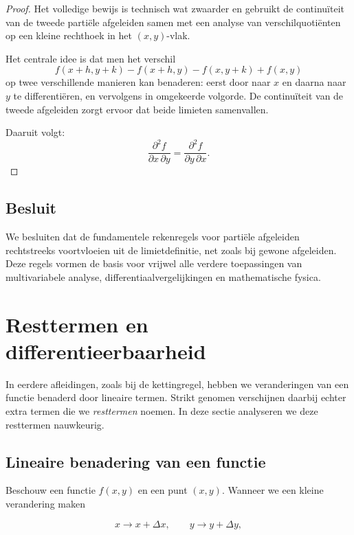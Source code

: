 \documentclass[11pt,a4paper]{article}
\begin{document}
    \begin{proof}
        Het volledige bewijs is technisch wat zwaarder en gebruikt de continuïteit van de tweede
        partiële afgeleiden samen met een analyse van verschilquotiënten op een kleine rechthoek
        in het $(x,y)$-vlak.

        Het centrale idee is dat men het verschil
        \[
            f(x+h,y+k)-f(x+h,y)-f(x,y+k)+f(x,y)
        \]
        op twee verschillende manieren kan benaderen: eerst door naar $x$ en daarna naar $y$
        te differentiëren, en vervolgens in omgekeerde volgorde. De continuïteit van de tweede
        afgeleiden zorgt ervoor dat beide limieten samenvallen.

        Daaruit volgt:
        \[
            \frac{\partial^2 f}{\partial x\,\partial y}
            =
            \frac{\partial^2 f}{\partial y\,\partial x}.
        \]
    \end{proof}

    \subsection{Besluit}

    We besluiten dat de fundamentele rekenregels voor partiële afgeleiden rechtstreeks
    voortvloeien uit de limietdefinitie, net zoals bij gewone afgeleiden. Deze regels vormen
    de basis voor vrijwel alle verdere toepassingen van multivariabele analyse, differentiaalvergelijkingen
    en mathematische fysica.


    \section{Resttermen en differentieerbaarheid}

    In eerdere afleidingen, zoals bij de kettingregel, hebben we veranderingen van een
    functie benaderd door lineaire termen. Strikt genomen verschijnen daarbij echter
    extra termen die we \textit{resttermen} noemen. In deze sectie analyseren we deze
    resttermen nauwkeurig.

    \subsection{Lineaire benadering van een functie}

    Beschouw een functie $f(x,y)$ en een punt $(x,y)$.
    Wanneer we een kleine verandering maken

    \[
        x \to x+\Delta x, \qquad y \to y+\Delta y,
    \]
\end{document}
